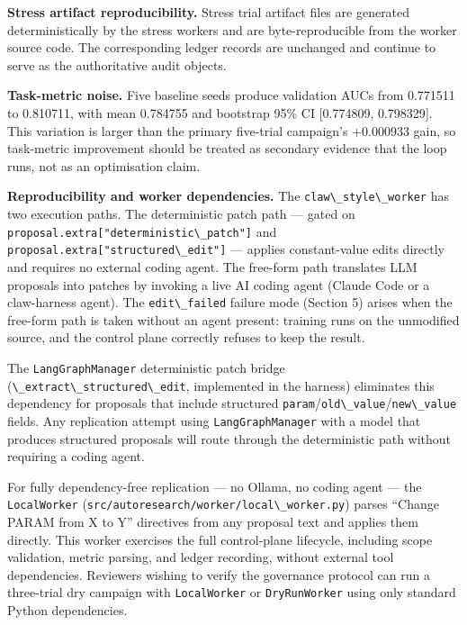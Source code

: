 \textbf{Stress artifact reproducibility.} Stress trial artifact files are generated deterministically by the stress workers and are byte-reproducible from the worker source code. The corresponding ledger records are unchanged and continue to serve as the authoritative audit objects.

\textbf{Task-metric noise.} Five baseline seeds produce validation AUCs from 0.771511 to 0.810711, with mean 0.784755 and bootstrap 95\% CI {[}0.774809, 0.798329{]}. This variation is larger than the primary five-trial campaign's +0.000933 gain, so task-metric improvement should be treated as secondary evidence that the loop runs, not as an optimisation claim.

\textbf{Reproducibility and worker dependencies.} The \passthrough{\lstinline!claw\_style\_worker!} has two execution paths. The deterministic patch path --- gated on \passthrough{\lstinline!proposal.extra["deterministic\_patch"]!} and \passthrough{\lstinline!proposal.extra["structured\_edit"]!} --- applies constant-value edits directly and requires no external coding agent. The free-form path translates LLM proposals into patches by invoking a live AI coding agent (Claude Code or a claw-harness agent). The \passthrough{\lstinline!edit\_failed!} failure mode (Section 5) arises when the free-form path is taken without an agent present: training runs on the unmodified source, and the control plane correctly refuses to keep the result.

The \passthrough{\lstinline!LangGraphManager!} deterministic patch bridge (\passthrough{\lstinline!\_extract\_structured\_edit!}, implemented in the harness) eliminates this dependency for proposals that include structured \passthrough{\lstinline!param!}/\passthrough{\lstinline!old\_value!}/\passthrough{\lstinline!new\_value!} fields. Any replication attempt using \passthrough{\lstinline!LangGraphManager!} with a model that produces structured proposals will route through the deterministic path without requiring a coding agent.

For fully dependency-free replication --- no Ollama, no coding agent --- the \passthrough{\lstinline!LocalWorker!} (\passthrough{\lstinline!src/autoresearch/worker/local\_worker.py!}) parses ``Change PARAM from X to Y'' directives from any proposal text and applies them directly. This worker exercises the full control-plane lifecycle, including scope validation, metric parsing, and ledger recording, without external tool dependencies. Reviewers wishing to verify the governance protocol can run a three-trial dry campaign with \passthrough{\lstinline!LocalWorker!} or \passthrough{\lstinline!DryRunWorker!} using only standard Python dependencies.


